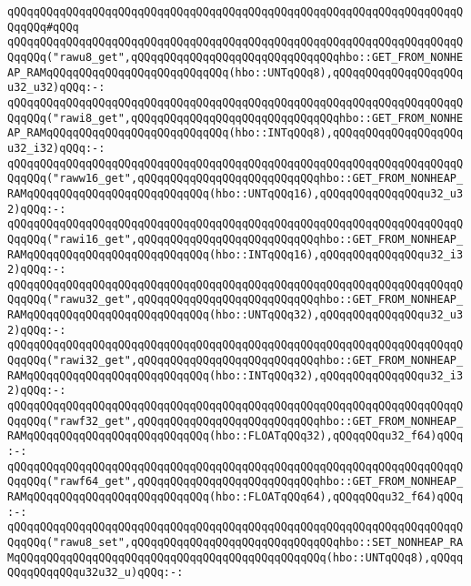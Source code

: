 \verb|qQQqqQQqqQQqqQQqqQQqqQQqqQQqqQQqqQQqqQQqqQQqqQQqqQQqqQQqqQQqqQQqqQQqqQQqqQQq#qQQq|\newline
\verb|qQQqqQQqqQQqqQQqqQQqqQQqqQQqqQQqqQQqqQQqqQQqqQQqqQQqqQQqqQQqqQQqqQQqqQQqqQQq("rawu8_get",qQQqqQQqqQQqqQQqqQQqqQQqqQQqqQQqhbo::GET_FROM_NONHEAP_RAMqQQqqQQqqQQqqQQqqQQqqQQqqQQq(hbo::UNTqQQq8),qQQqqQQqqQQqqQQqqQQqu32_u32)qQQq:-:|\newline
\verb|qQQqqQQqqQQqqQQqqQQqqQQqqQQqqQQqqQQqqQQqqQQqqQQqqQQqqQQqqQQqqQQqqQQqqQQqqQQq("rawi8_get",qQQqqQQqqQQqqQQqqQQqqQQqqQQqqQQqhbo::GET_FROM_NONHEAP_RAMqQQqqQQqqQQqqQQqqQQqqQQqqQQq(hbo::INTqQQq8),qQQqqQQqqQQqqQQqqQQqu32_i32)qQQq:-:|\newline
\verb|qQQqqQQqqQQqqQQqqQQqqQQqqQQqqQQqqQQqqQQqqQQqqQQqqQQqqQQqqQQqqQQqqQQqqQQqqQQq("raww16_get",qQQqqQQqqQQqqQQqqQQqqQQqqQQqhbo::GET_FROM_NONHEAP_RAMqQQqqQQqqQQqqQQqqQQqqQQqqQQq(hbo::UNTqQQq16),qQQqqQQqqQQqqQQqu32_u32)qQQq:-:|\newline
\verb|qQQqqQQqqQQqqQQqqQQqqQQqqQQqqQQqqQQqqQQqqQQqqQQqqQQqqQQqqQQqqQQqqQQqqQQqqQQq("rawi16_get",qQQqqQQqqQQqqQQqqQQqqQQqqQQqhbo::GET_FROM_NONHEAP_RAMqQQqqQQqqQQqqQQqqQQqqQQqqQQq(hbo::INTqQQq16),qQQqqQQqqQQqqQQqu32_i32)qQQq:-:|\newline
\verb|qQQqqQQqqQQqqQQqqQQqqQQqqQQqqQQqqQQqqQQqqQQqqQQqqQQqqQQqqQQqqQQqqQQqqQQqqQQq("rawu32_get",qQQqqQQqqQQqqQQqqQQqqQQqqQQqhbo::GET_FROM_NONHEAP_RAMqQQqqQQqqQQqqQQqqQQqqQQqqQQq(hbo::UNTqQQq32),qQQqqQQqqQQqqQQqu32_u32)qQQq:-:|\newline
\verb|qQQqqQQqqQQqqQQqqQQqqQQqqQQqqQQqqQQqqQQqqQQqqQQqqQQqqQQqqQQqqQQqqQQqqQQqqQQq("rawi32_get",qQQqqQQqqQQqqQQqqQQqqQQqqQQqhbo::GET_FROM_NONHEAP_RAMqQQqqQQqqQQqqQQqqQQqqQQqqQQq(hbo::INTqQQq32),qQQqqQQqqQQqqQQqu32_i32)qQQq:-:|\newline
\verb|qQQqqQQqqQQqqQQqqQQqqQQqqQQqqQQqqQQqqQQqqQQqqQQqqQQqqQQqqQQqqQQqqQQqqQQqqQQq("rawf32_get",qQQqqQQqqQQqqQQqqQQqqQQqqQQqhbo::GET_FROM_NONHEAP_RAMqQQqqQQqqQQqqQQqqQQqqQQqqQQq(hbo::FLOATqQQq32),qQQqqQQqu32_f64)qQQq:-:|\newline
\verb|qQQqqQQqqQQqqQQqqQQqqQQqqQQqqQQqqQQqqQQqqQQqqQQqqQQqqQQqqQQqqQQqqQQqqQQqqQQq("rawf64_get",qQQqqQQqqQQqqQQqqQQqqQQqqQQqhbo::GET_FROM_NONHEAP_RAMqQQqqQQqqQQqqQQqqQQqqQQqqQQq(hbo::FLOATqQQq64),qQQqqQQqu32_f64)qQQq:-:|\newline
\verb|qQQqqQQqqQQqqQQqqQQqqQQqqQQqqQQqqQQqqQQqqQQqqQQqqQQqqQQqqQQqqQQqqQQqqQQqqQQq("rawu8_set",qQQqqQQqqQQqqQQqqQQqqQQqqQQqqQQqhbo::SET_NONHEAP_RAMqQQqqQQqqQQqqQQqqQQqqQQqqQQqqQQqqQQqqQQqqQQqqQQq(hbo::UNTqQQq8),qQQqqQQqqQQqqQQqu32u32_u)qQQq:-:|\newline
